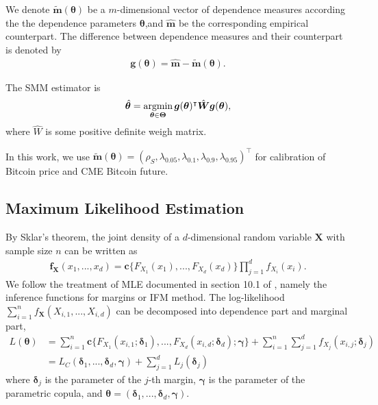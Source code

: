 We denote $\tilde{\bm{m}}(\bm{\theta})$ be a $m$-dimensional vector of dependence measures according the the
dependence parameters $\bm{\theta}$,and  $\hat{\bm{m}}$ be the corresponding empirical counterpart.
The difference between dependence measures and their counterpart is denoted by
\begin{align*}
    \bm{g}(\bm{\theta}) = \hat{\bm{m}} - \tilde{\bm{m}}(\bm{\theta}).
\end{align*}\medskip

The SMM estimator is
\begin{align*}
    \hat{\bm{\theta}} = \argmin_{\bm{\theta}\in \bm{\Theta}} \bm{g}(\bm{\theta})^\intercal
    \hat{\bm{W}}
     \bm{g}(\bm{\theta}),
\end{align*}
where $\hat{W}$ is some positive definite weigh matrix.\medskip

In this work, we use $\tilde{\bm{m}}(\bm{\theta}) = (\rho_S, \lambda_{0.05}, \lambda_{0.1},
\lambda_{0.9}, \lambda_{0.95})^\intercal$
for calibration of Bitcoin price and CME Bitcoin future.

\subsection{Maximum Likelihood Estimation}\label{subsec:maximum-likelihood-estimation}
By Sklar's theorem, the joint density of a $d$-dimensional random variable $\bm{X}$ with sample size $n$ can be written as
\begin{align}
    \bm{f}_{\bm{X}}(x_1, ..., x_d) = \bm{c}\{F_{X_1}(x_1), ..., F_{X_d}(x_d)\} \prod_{j=1}^d f_{X_i}(x_i).
    \end{align}
We follow the treatment of MLE documented in section 10.1 of \citet{joe1997multivariate}, namely the inference functions for margins or IFM method.
The log-likelihood $\sum^n_{i=1}f_{\bm{X}}(X_{i,1}, ..., X_{i,d})$ can be decomposed into dependence part and marginal part,
\begin{align}
    L(\bm{\theta}) &= \sum_{i=1}^n \bm{c}\{F_{X_1}(x_{i,1};\bm{\delta}_1), ..., F_{X_d}(x_{i,d}; \bm{\delta}_d);\bm{\gamma}\}
    + \sum_{i=1}^n \sum_{j=1}^d f_{X_j}(x_{i,j};\bm{\delta}_j)\\
    &= L_C(\bm{\delta}_1, ..., \bm{\delta}_d, \bm{\gamma}) + \sum_{j=1}^d L_j(\bm{\delta}_j)
    \end{align}
where $\bm{\delta}_j$ is the parameter of the $j$-th margin, $\bm{\gamma}$ is the parameter of the parametric copula, and
$\bm{\theta} = (\bm{\delta}_1,..., \bm{\delta}_d, \bm{\gamma})$.

